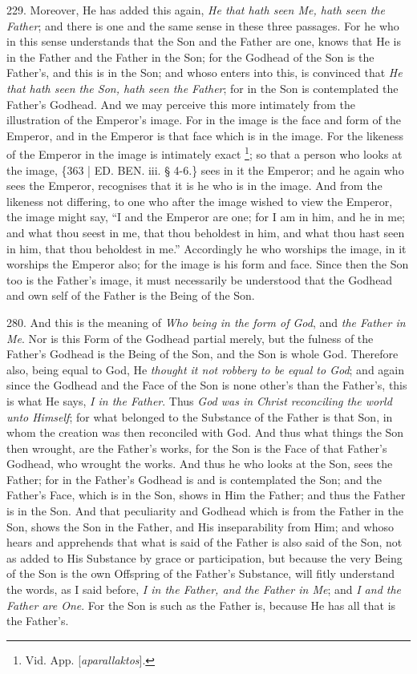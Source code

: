 229.
Moreover, He has added this again, \emph{He that hath seen Me, hath seen
the Father}; and there is one and the same sense in these three
passages. For he who in this sense understands that the Son and the
Father are one, knows that He is in the Father and the Father in the
Son; for the Godhead of the Son is the Father's, and this is in the
Son; and whoso enters into this, is convinced that \emph{He that hath
seen the Son, hath seen the Father}; for in the Son is contemplated
the Father's Godhead. And we may perceive this more intimately from
the illustration of the Emperor's image. For in the image is the face
and form of the Emperor, and in the Emperor is that face which is in
the image. For the likeness of the Emperor in the image is intimately
exact \footnote{Vid. App. [\emph{aparallaktos}].}; so that a person
who looks at the image, \{363 | ED.
BEN.
iii. § 4-6.\} sees in it the Emperor; and he again who sees the
Emperor, recognises that it is he who is in the image. And from the
likeness not differing, to one who after the image wished to view the
Emperor, the image might say, ``I and the Emperor are one; for I am in
him, and he in me; and what thou seest in me, that thou beholdest in
him, and what thou hast seen in him, that thou beholdest in me.''
Accordingly he who worships the image, in it worships the Emperor
also; for the image is his form and face. Since then the Son too is
the Father's image, it must necessarily be understood that the Godhead
and own self of the Father is the Being of the Son.

280. And this is the meaning of \emph{Who
being in the form of God}, and \emph{the Father in Me}. Nor is this
Form of the Godhead partial merely, but the fulness of the Father's
Godhead is the Being of the Son, and the Son is whole God. Therefore
also, being equal to God, He \emph{thought it not robbery to be equal to
God}; and again since the Godhead and the Face of the Son is none
other's than the Father's, this is what He says, \emph{I in the Father}.
Thus \emph{God was in Christ reconciling the world unto Himself}; for
what belonged to the Substance of the Father is that Son, in whom the
creation was then reconciled with God. And thus what things the Son
then wrought, are the Father's works, for the Son is the Face of that
Father's Godhead, who wrought the works. And thus he who looks at the
Son, sees the Father; for in the Father's Godhead is and is
contemplated the Son; and the Father's Face, which is in the Son,
shows in Him the Father; and thus the Father is in the Son. And that
peculiarity and Godhead which is from the Father in the Son, shows the
Son in the Father, and His inseparability from Him; and whoso hears
and apprehends that what is said of the Father is also said of the
Son, not as added to His Substance by grace or participation, but
because the very Being of the Son is the own Offspring of the
Father's Substance, will fitly understand the words, as I said before,
\emph{I in the Father, and the Father in Me}; and \emph{I and the Father
are One}. For the Son is such as the Father is, because He has all
that is the Father's.

